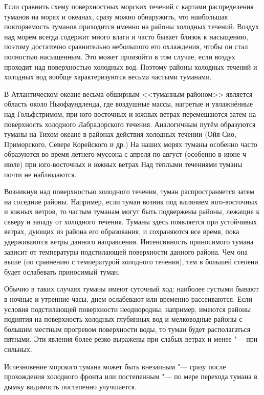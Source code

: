 Если сравнить схему поверхностных морских течений с картами
распределения туманов на морях и океанах, сразу можно обнаружить, что
наибольшая повторяемость туманов приходится именно на районы холодных
течений. Воздух над морем всегда содержит много влаги и часто бывает
близок к насыщению, поэтому достаточно сравнительно небольшого его
охлаждения, чтобы он стал полностью насыщенным. Это может произойти в
том случае, если воздух проходит над поверхностью холодных вод. Поэтому
районы холодных течений и холодных вод вообще характеризуются весьма
частыми туманами.

В Атлантическом океане весьма обширным <<туманным районом>> является
область около Ньюфаундленда, где воздушные массы, нагретые и
увлажнённые над Гольфстримом, при юго-восточных и южных ветрах
перемещаются затем на поверхность холодного Лабрадорского
течения. Аналогичным путём образуются туманы на Тихом океане в районах
действия холодных течении (Ойя-Сио, Приморского, Севере Корейского и
др.) На наших морях туманы особенно часто образуются во время летнего
муссона с апреля по август (особенно в июне ч июле) при юго-восточных
и южных ветрах Над тёплыми течениями туманы почти не наблюдаются.

Возникнув над поверхностью холодного течения, туман распространяется
затем на соседние районы. Например, если туман возник под влиянием
юго-восточных и южных ветров, то частым туманам могут быть подвержены
районы, лежащие к северу и западу от холодного течения. Туманы здесь
появляется при устойчивых ветрах, дующих из района его образования, и
сохраняются все время, пока удерживаются ветры данного
направления. Интенсивность приносимого тумана зависит от температуры
подстилающей поверхности данного района. Чем она выше (по сравнению с
температурой холодного течения), тем в большей степени будет
ослабевать приносимый туман.

Обычно в таких случаях туманы имеют суточный ход: наиболее густыми
бывают в ночные и утренние часы, днем ослабевают или временно
рассеиваются. Если условия подстилающей поверхности неоднородны,
например, имеются районы поднятия на поверхность холодных глубинных
вод и мелководные районы с большим местным прогревом поверхности воды,
то туман будет располагаться пятнами. Эти явления более резко выражены
при слабых ветрах и менее "--- при сильных.

Исчезновение морского тумана может быть внезапным "--- сразу после
прохождения холодного фронта или постепенным "--- по мере перехода тумана
в дымку видимость постепенно улучшается.

